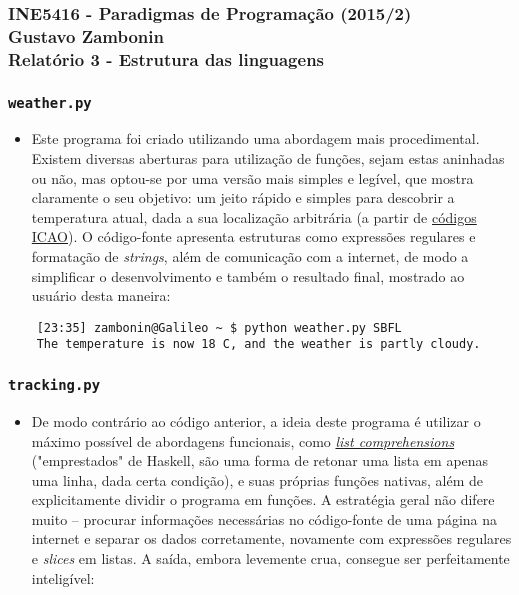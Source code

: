 \documentclass{article}
\begin{document}
\subsubsection*{INE5416 - Paradigmas de Programação (2015/2) \\
    Gustavo Zambonin \\
    Relatório 3 - Estrutura das linguagens
}

\subsubsection*{\texttt{weather.py}}
\begin{itemize}
    \item Este programa foi criado utilizando uma abordagem mais procedimental. Existem diversas aberturas para utilização de funções, sejam estas aninhadas ou não, mas optou-se por uma versão mais simples e legível, que mostra claramente o seu objetivo: um jeito rápido e simples para descobrir a temperatura atual, dada a sua localização arbitrária (a partir de \href{http://www.airlineupdate.com/content_public/codes/airportcodes/airport_icaocodes/airport_icao.htm}{códigos ICAO}). O código-fonte apresenta estruturas como expressões regulares e formatação de \textit{strings}, além de comunicação com a internet, de modo a simplificar o desenvolvimento e também o resultado final, mostrado ao usuário desta maneira:
\end{itemize}

\begin{verbatim}
    [23:35] zambonin@Galileo ~ $ python weather.py SBFL
    The temperature is now 18 C, and the weather is partly cloudy.
\end{verbatim}

\subsubsection*{\texttt{tracking.py}}
\begin{itemize}
    \item De modo contrário ao código anterior, a ideia deste programa é utilizar o máximo possível de abordagens funcionais, como \href{https://docs.python.org/3/howto/functional.html#generator-expressions-and-list-comprehensions}{\textit{list comprehensions}} ("emprestados" de Haskell, são uma forma de retonar uma lista em apenas uma linha, dada certa condição), e suas próprias funções nativas, além de explicitamente dividir o programa em funções. A estratégia geral não difere muito -- procurar informações necessárias no código-fonte de uma página na internet e separar os dados corretamente, novamente com expressões regulares e \textit{slices} em listas. A saída, embora levemente crua, consegue ser perfeitamente inteligível:
\end{itemize}
\end{document}
